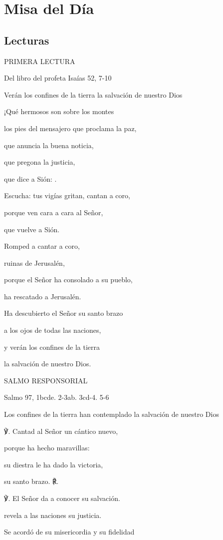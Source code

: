 \chapter{Misa del Día}

\section{Lecturas}

PRIMERA LECTURA

Del libro del profeta Isaías 52, 7-10

Verán los confines de la tierra la salvación de nuestro Dios

¡Qué hermosos son sobre los montes

los pies del mensajero que proclama la paz,

que anuncia la buena noticia,

que pregona la justicia,

que dice a Sión: .

Escucha: tus vigías gritan, cantan a coro,

porque ven cara a cara al Señor,

que vuelve a Sión.

Romped a cantar a coro,

ruinas de Jerusalén,

porque el Señor ha consolado a su pueblo,

ha rescatado a Jerusalén.

Ha descubierto el Señor su santo brazo

a los ojos de todas las naciones,

y verán los confines de la tierra

la salvación de nuestro Dios.

SALMO RESPONSORIAL

Salmo 97, 1bcde. 2-3ab. 3cd-4. 5-6

Los confines de la tierra han contemplado la salvación de nuestro Dios

℣. Cantad al Señor un cántico nuevo,

porque ha hecho maravillas:

su diestra le ha dado la victoria,

su santo brazo. ℟.

℣. El Señor da a conocer su salvación.

revela a las naciones su justicia.

Se acordó de su misericordia y su fidelidad

